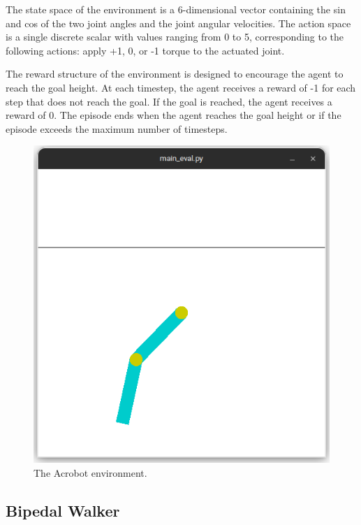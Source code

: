 \documentclass[conference]{IEEEtran}
\begin{document}
The state space of the environment is a 6-dimensional vector containing the sin and cos of the two joint angles and the joint angular velocities. The action space is a single discrete scalar with values ranging from 0 to 5, corresponding to the following actions: apply +1, 0, or -1 torque to the actuated joint.

The reward structure of the environment is designed to encourage the agent to reach the goal height. At each timestep, the agent receives a reward of -1 for each step that does not reach the goal. If the goal is reached, the agent receives a reward of 0. The episode ends when the agent reaches the goal height or if the episode exceeds the maximum number of timesteps.

\begin{figure}[htbp]
    \centerline{\includegraphics[width=\columnwidth]{./img/acrobot-env.png}}
    \caption{The Acrobot environment.}
    \label{fig:acrobot-env}
\end{figure}

\subsection{Bipedal Walker}
\end{document}
